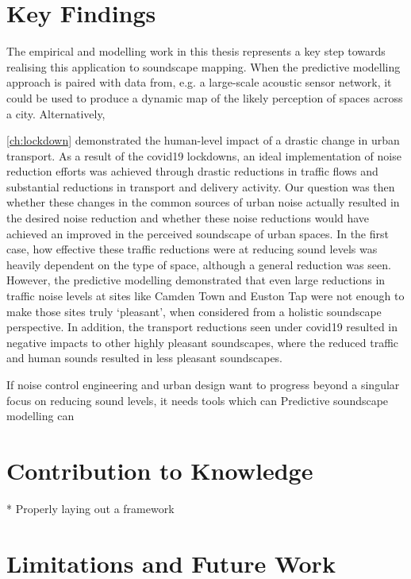 \section{Key Findings}

The empirical and modelling work in this thesis represents a key step towards realising this application to soundscape mapping. When the predictive modelling approach is paired with data from, e.g. a large-scale acoustic sensor network, it could be used to produce a dynamic map of the likely perception of spaces across a city. Alternatively, 


\cref{ch:lockdown} demonstrated the human-level impact of a drastic change in urban transport. As a result of the \gls{covid19} lockdowns, an ideal implementation of noise reduction efforts was achieved through drastic reductions in traffic flows and substantial reductions in transport and delivery activity. Our question was then whether these changes in the common sources of urban noise actually resulted in the desired noise reduction and whether these noise reductions would have achieved an improved in the perceived soundscape of urban spaces. In the first case, how effective these traffic reductions were at reducing sound levels was heavily dependent on the type of space, although a general reduction was seen. However, the predictive modelling demonstrated that even large reductions in traffic noise levels at sites like Camden Town and Euston Tap were not enough to make those sites truly `pleasant', when considered from a holistic soundscape perspective. In addition, the transport reductions seen under \gls{covid19} resulted in negative impacts to other highly pleasant soundscapes, where the reduced traffic and human sounds resulted in less pleasant soundscapes. 

If noise control engineering and urban design want to progress beyond a singular focus on reducing sound levels, it needs tools which can 
Predictive soundscape modelling can 

\section{Contribution to Knowledge}
* Properly laying out a framework 

\section{Limitations and Future Work}

